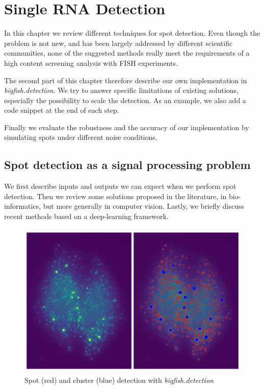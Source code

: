 
\graphicspath{{./figures/chapter2/}}


\chapter{Single RNA Detection} \label{ch:chapter2}
\minitoc
\newpage

In this chapter we review different techniques for spot detection.
Even though the problem is not new, and has been largely addressed by different scientific communities, none of the suggested methods really meet the requirements of a high content screening analysis with \ac{FISH} experiments.

The second part of this chapter therefore describe our own implementation in \mbox{\emph{bigfish.detection}}.
We try to answer specific limitations of existing solutions, especially the possibility to scale the detection.
As an example, we also add a code snippet at the end of each step.

Finally we evaluate the robustness and the accuracy of our implementation by simulating spots under different noise conditions.

\section{Spot detection as a signal processing problem} \label{sec:detection_introduction}

We first describe inputs and outputs we can expect when we perform spot detection.
Then we review some solutions proposed in the literature, in bio-informatics, but more generally in computer vision.
Lastly, we briefly discuss recent methods based on a deep-learning framework.

\begin{figure}[h]
    \centering
    \includegraphics[width=1\textwidth]{figures/chapter2/cluster_detection_results}
    \caption{Spot (red) and cluster (blue) detection with \emph{bigfish.detection}}
    \label{fig:detection_results}
\end{figure}

